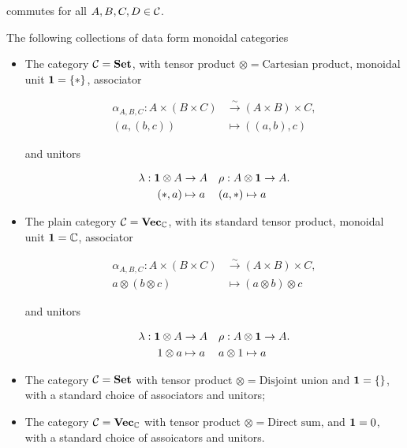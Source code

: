\begin{defn}
\begin{enumerate}
commutes for all $A,B,C,D\in {\mathcal C}$.
\end{enumerate}
\end{defn}

\begin{ex}\label{monoidal-category-examples}
The following collections of data form monoidal categories

\begin{itemize}
\item The category ${\mathcal C}={\bf Set}$, with tensor product $\otimes = \text{Cartesian product}$, monoidal unit ${\mathbf 1} =\{*\}$, associator

\begin{align*}
\alpha_{A,B,C}: A\times (B\times C) &\xrightarrow{\sim}(A\times B)\times C,\\
(a,(b,c))&\mapsto ((a,b),c)
\end{align*}

and unitors 

\begin{align*}
\lambda: {\mathbf 1} \otimes A &\to A && \rho:  A\otimes {\mathbf 1} \to A.\\
(*, a)&\mapsto a && (a,*)\mapsto a
\end{align*}

\item The plain category ${\mathcal C}={\bf Vec}_{{\mathbb C}}$, with its standard tensor product, monoidal unit ${\mathbf 1} ={\mathbb C}$, associator

\begin{align*}
\alpha_{A,B,C}: A\times (B\times C) &\xrightarrow{\sim}(A\times B)\times C,\\
a\otimes (b\otimes c ) & \mapsto (a\otimes b)\otimes c
\end{align*}

and unitors 

\begin{align*}
\lambda: {\mathbf 1} \otimes A &\to A && \rho:  A\otimes {\mathbf 1} \to A.\\
1\otimes a &\mapsto  a && a\otimes 1 \mapsto a
\end{align*}

\item The category ${\mathcal C}={\bf Set}$ with tensor product $\otimes=\text{Disjoint union}$ and ${\mathbf 1}=\{\}$, with a standard choice of associators and unitors;

\item The category ${\mathcal C}={\bf Vec}_{{\mathbb C}}$ with tensor product $\otimes = \text{Direct sum}$, and ${\mathbf 1} = 0$, with a standard choice of assoicators and unitors.
\end{itemize}
\end{ex}

